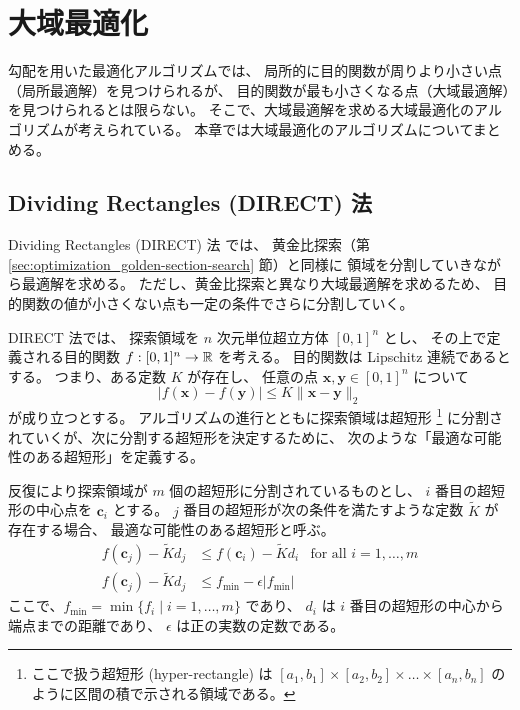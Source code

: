 %

\chapter{大域最適化}

勾配を用いた最適化アルゴリズムでは、
局所的に目的関数が周りより小さい点（局所最適解）を見つけられるが、
目的関数が最も小さくなる点（大域最適解）を見つけられるとは限らない。
そこで、大域最適解を求める大域最適化のアルゴリズムが考えられている。
本章では大域最適化のアルゴリズムについてまとめる。

\section{Dividing Rectangles (DIRECT) 法}

Dividing Rectangles (DIRECT) 法 \cite{Jones1993} では、
黄金比探索（第 \ref{sec:optimization_golden-section-search} 節）と同様に
領域を分割していきながら最適解を求める。
ただし、黄金比探索と異なり大域最適解を求めるため、
目的関数の値が小さくない点も一定の条件でさらに分割していく。

DIRECT 法では、
探索領域を $n$ 次元単位超立方体 $[0, 1]^n$ とし、
その上で定義される目的関数 $f : [0, 1]^n \to \mathbb{R}$ を考える。
目的関数は Lipschitz 連続であるとする。
つまり、ある定数 $K$ が存在し、
任意の点 $\bm{x}, \bm{y} \in [0, 1]^n$ について
\begin{equation}
    |f(\bm{x}) - f(\bm{y})| \le K \|\bm{x} - \bm{y}\|_2
\end{equation}
が成り立つとする。
アルゴリズムの進行とともに探索領域は超短形
\footnote{ここで扱う超短形 (hyper-rectangle) は%
$[a_1, b_1] \times [a_2, b_2] \times \ldots \times [a_n, b_n]$%
のように区間の積で示される領域である。}
に分割されていくが、次に分割する超短形を決定するために、
次のような「最適な可能性のある超短形」を定義する。

\begin{definition}
    \label{def:optimization_direct_potentially-optimal}
    反復により探索領域が $m$ 個の超短形に分割されているものとし、
    $i$ 番目の超短形の中心点を $\bm{c}_i$ とする。
    $j$ 番目の超短形が次の条件を満たすような定数 $\tilde{K}$ が存在する場合、
    最適な可能性のある超短形と呼ぶ。
    \begin{align}
        f(\bm{c}_j) - \tilde{K} d_j &\le f(\bm{c}_i) - \tilde{K} d_i & \text{for all $i = 1, \ldots, m$}
        \label{eq:optimization_direct_potentially-optimal_smaller-than-others}
        \\
        f(\bm{c}_j) - \tilde{K} d_j &\le f_{\text{min}} - \epsilon |f_{\text{min}}|
        \label{eq:optimization_direct_potentially-optimal_smaller-than-now}
    \end{align}
    ここで、$f_{\text{min}} = \min{\{f_i \mid i = 1, \ldots, m\}}$ であり、
    $d_i$ は $i$ 番目の超短形の中心から端点までの距離であり、
    $\epsilon$ は正の実数の定数である。
\end{definition}

